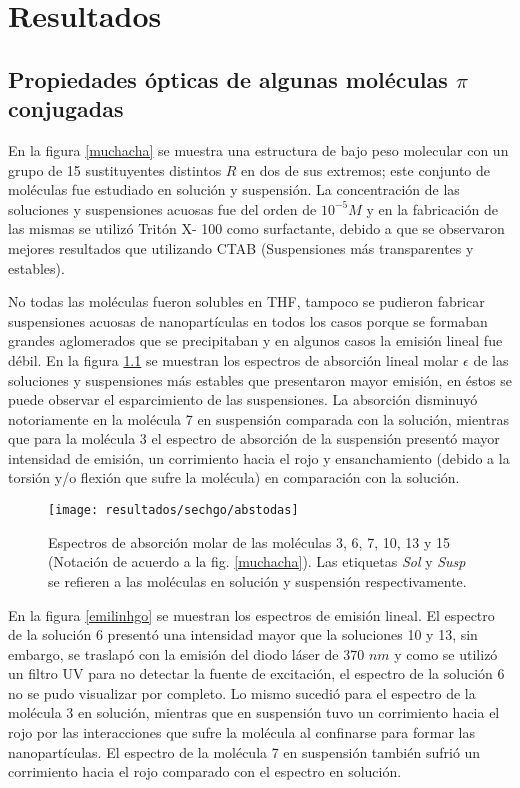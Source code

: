 \chapter{Resultados}   
\minitoc

\section{Propiedades \'opticas de algunas mol\'eculas $\pi$ conjugadas}

En la figura \ref{muchacha} se muestra una estructura de bajo peso molecular con un grupo de 15 sustituyentes distintos $R$ en dos de sus extremos; este conjunto de mol\'eculas fue estudiado en soluci\'on y suspensi\'on. La concentraci\'on de las soluciones y suspensiones acuosas fue del orden de $10^{-5} M$ y en la fabricaci\'on de las mismas se utiliz\'o Trit\'on X- 100 como surfactante, debido a que se observaron mejores resultados que utilizando CTAB (Suspensiones m\'as transparentes y estables).

No todas las mol\'eculas fueron solubles en THF, tampoco se pudieron fabricar suspensiones acuosas de nanopart\'iculas en todos los casos porque se formaban grandes aglomerados que se precipitaban y en algunos casos la emisi\'on lineal fue d\'ebil. En la figura \ref{abshgo} se muestran los espectros de absorci\'on lineal molar $\epsilon$ de las soluciones y suspensiones m\'as estables que presentaron mayor emisi\'on, en \'estos se puede observar el esparcimiento de las suspensiones. La absorci\'on disminuy\'o notoriamente en la mol\'ecula 7 en suspensi\'on comparada con la soluci\'on, mientras que para la mol\'ecula 3 el espectro de absorci\'on  de la suspensi\'on present\'o mayor intensidad de emisi\'on, un corrimiento hacia el rojo y ensanchamiento (debido a la torsi\'on y/o flexi\'on que sufre la mol\'ecula) en comparaci\'on con la soluci\'on.

\begin{figure}[h]
\centering
\texttt{[image: resultados/sechgo/abstodas]}
\caption{Espectros de absorci\'on molar de las mol\'eculas 3, 6, 7, 10, 13 y 15 (Notaci\'on de acuerdo a la fig. \ref{muchacha}). Las etiquetas \emph{Sol} y \emph{Susp} se refieren a las mol\'eculas en soluci\'on y suspensi\'on respectivamente.}\label{abshgo}
\end{figure}

En la figura \ref{emilinhgo} se muestran los espectros de emisi\'on lineal. El espectro de la soluci\'on 6 present\'o una intensidad mayor que la soluciones 10 y 13, sin embargo, se traslap\'o con la emisi\'on del diodo l\'aser de 370 $nm$ y como se utiliz\'o un filtro UV para no detectar la fuente de excitaci\'on, el espectro de la soluci\'on 6 no se pudo visualizar por completo. Lo mismo sucedi\'o para el espectro de la mol\'ecula 3 en soluci\'on, mientras que en suspensi\'on tuvo un corrimiento hacia el rojo por las interacciones que sufre la mol\'ecula al confinarse para formar las nanopart\'iculas. El espectro de la mol\'ecula 7 en suspensi\'on tambi\'en sufri\'o un corrimiento hacia el rojo comparado con el espectro en soluci\'on.

